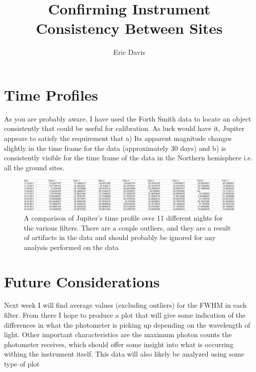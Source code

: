 \documentclass[11pt]{article}
\title{Confirming Instrument Consistency Between Sites}
\author{Eric Davis}
\begin{document}
\maketitle
\medskip



\section{Time Profiles}
\hspace{0.5cm}

As you are probably aware, I have used the Forth Smith data to locate an object consistently that could be useful for calibration. As luck would have it, Jupiter appears to satisfy the requirement that a) Its apparent magnitude changes slightly in the time frame for the data (approximately 30 days) and b) is consistently visible for the time frame of the data in the Northern hemisphere i.e. all the ground sites. 


\begin{figure}[h!]
\includegraphics[scale=0.5]{fwhmcomparison.jpg}
\caption{A comparison of Jupiter's time profile over 11 different nights for the various filters. There are a couple outliers, and they are a result of artifacts in the data and should probably be ignored for any analysis performed on the data}
\end{figure}



\section{Future Considerations}

Next week I will find average values (excluding outliers) for the FWHM in each filter. From there I hope to produce a plot that will give some indication of the differences in what the photometer is picking up depending on the wavelength of light. Other important characteristics are the maximum photon counts the photometer receives, which should offer some insight into what is occurring withing the instrument itself. This data will also likely be analyzed using some type of plot
\end{document}
